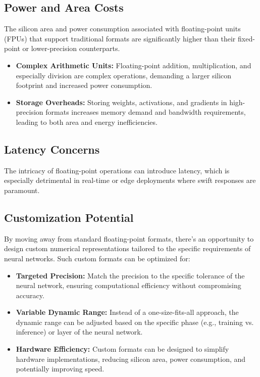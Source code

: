 \subsection{Power and Area Costs}

The silicon area and power consumption associated with floating-point units (FPUs) that support traditional formats are significantly higher than their fixed-point or lower-precision counterparts.

\begin{itemize}
	\item \textbf{Complex Arithmetic Units:} Floating-point addition, multiplication, and especially division are complex operations, demanding a larger silicon footprint and increased power consumption.
	
	\item \textbf{Storage Overheads:} Storing weights, activations, and gradients in high-precision formats increases memory demand and bandwidth requirements, leading to both area and energy inefficiencies.
\end{itemize}

\subsection{Latency Concerns}

The intricacy of floating-point operations can introduce latency, which is especially detrimental in real-time or edge deployments where swift responses are paramount.

\subsection{Customization Potential}

By moving away from standard floating-point formats, there's an opportunity to design custom numerical representations tailored to the specific requirements of neural networks. Such custom formats can be optimized for:

\begin{itemize}
	\item \textbf{Targeted Precision:} Match the precision to the specific tolerance of the neural network, ensuring computational efficiency without compromising accuracy.
	
	\item \textbf{Variable Dynamic Range:} Instead of a one-size-fits-all approach, the dynamic range can be adjusted based on the specific phase (e.g., training vs. inference) or layer of the neural network.
	
	\item \textbf{Hardware Efficiency:} Custom formats can be designed to simplify hardware implementations, reducing silicon area, power consumption, and potentially improving speed.
\end{itemize}

